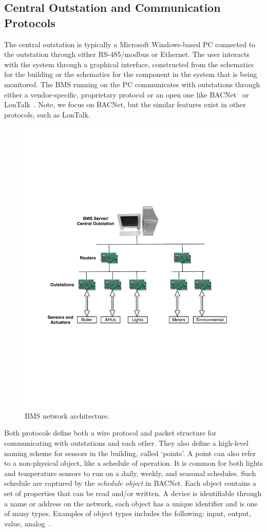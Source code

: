 \subsection{Central Outstation and Communication Protocols}
The central outstation is typically a Microsoft Windows-based PC connected to the outstation through either RS-485/modbus or Ethernet.
The user interacts with the system through a graphical interface, constructed from the schematics for the building or the schematics
for the component in the system that is being monitored.  The BMS running on the PC communicates with outstations through either a 
vendor-specific, proprietary protocol or an open one like BACNet~\cite{Bacnet} or LonTalk~\cite{LonTalk}.  Note, 
we focus on BACNet, but the similar features exist in other protocols, such as LonTalk.  

\begin{figure}[h!] %
\centering
\includegraphics[width=0.50\columnwidth]{figs/BMS_network}
\caption{BMS network architecture.}
\label{fig:bms_network}
\end{figure}

Both protocols define both a wire protocol and packet structure for communicating with outstations and each other.  They also define a high-level
naming scheme for sensors in the building, called `points'.  A point can also refer to a non-physical object, like a schedule of operation.
It is common for both lights and temperature sensors to run on a daily, weekly, and seasonal schedules.  Such schedule are captured
by the \emph{schedule object} in BACNet.  
Each object contains a set of properties that can 
be read and/or written.  A device is identifiable through a name or address on the network, each object has a unique identifier and is one of
many types.  Examples of object types includes the following: input, output, value, analog~\cite{Bacnet}.  


